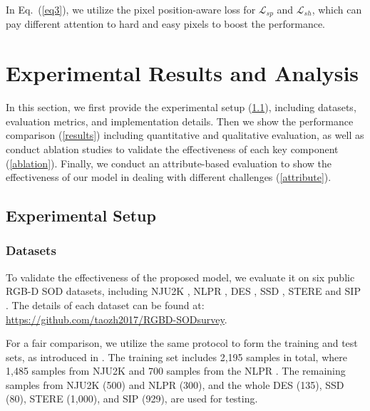 \documentclass[10pt,twocolumn,letterpaper]{article}
\begin{document}
In Eq.~(\ref{eq3}), we utilize the pixel position-aware loss \cite{wei2019f3net} for $\mathcal{L}_{sp}$ and $\mathcal{L}_{sh}$, which can pay different attention to hard and easy pixels to boost the performance.



\section{Experimental Results and Analysis}

In this section, we first provide the experimental setup (\ref{setup}), including datasets, evaluation metrics, and implementation details. Then we show the performance comparison (\ref{results}) including quantitative and qualitative evaluation, as well as conduct ablation studies to validate the effectiveness of each key component (\ref{ablation}). Finally, we conduct an attribute-based evaluation to show the effectiveness of our model in dealing with different challenges (\ref{attribute}).

\subsection{Experimental Setup}
\label{setup}

\subsubsection{Datasets}
To validate the effectiveness of the proposed model, we evaluate it on six public RGB-D SOD datasets, including NJU2K \cite{ju2014depth}, NLPR \cite{peng2014rgbd}, DES \cite{cheng2014depth}, SSD \cite{zhu2017three}, STERE \cite{niu2012leveraging} and SIP \cite{fan2019rethinking}. The details of each dataset can be found at: \url{https://github.com/taozh2017/RGBD-SODsurvey}.


For a fair comparison, we utilize the same protocol to form the training and test sets, as introduced in \cite{piao2019depth,fan2019rethinking}. The training set includes 2,195 samples in total, where 1,485 samples from NJU2K \cite{ju2014depth} and 700 samples from the NLPR \cite{peng2014rgbd}. The remaining samples from NJU2K (500) and NLPR (300), and the whole DES (135), SSD (80), STERE (1,000), and SIP (929), are used for testing.
\end{document}

